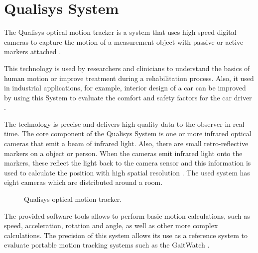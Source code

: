 \section{Qualisys System}
The Qualisys optical motion tracker is a system that uses high speed digital cameras to capture the motion of a measurement object with passive or active markers attached \cite{OlivaresBotzel2013}.

This technology is used by researchers and clinicians to understand the basics of human motion or improve treatment during a rehabilitation process. Also, it used in industrial applications, for example, interior design of a car can be improved by using this System to evaluate the comfort and safety factors for the car driver \cite{Qualisys}.

The technology is precise and delivers high quality data to the observer in real-time. The core component of the Qualisys System is one or more infrared optical cameras that emit a beam of infrared light. Also, there are small retro-reflective markers on a object or person. When the cameras emit infrared light onto the markers, these reflect the light back to the camera sensor and this information is used to calculate the position with high spatial resolution  \cite{Qualisys}. The used system has eight cameras which are distributed around a room.

\begin{figure}[H]
	\centering
	\caption{Qualisys optical motion tracker.}
	\label{fig:QS}
\end{figure}

The provided software tools allows to perform basic motion calculations, such as speed, acceleration, rotation and angle, as well as other more complex calculations. The precision of this system allows its use as a reference system to evaluate portable motion tracking systems such as the GaitWatch  \cite{OlivaresBotzel2013}.
